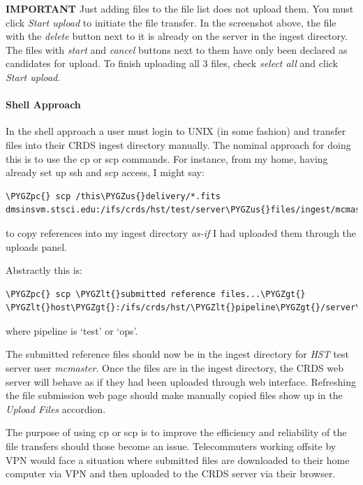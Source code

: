 \documentclass[letterpaper,10pt,english]{sphinxmanual}
\def\PYGZus{\char`\_}
\def\PYGZlt{\char`\<}
\def\PYGZgt{\char`\>}
\def\PYGZpc{\char`\%}
\begin{document}
\textbf{IMPORTANT}  Just adding files to the file list does not upload them.   You
must click \emph{Start upload} to initiate the file transfer.   In the screenshot above,
the file with the \emph{delete} button next to it is already on the server in the
ingest directory.   The files with \emph{start} and \emph{cancel} buttons next to them have
only been declared as candidates for upload.   To finish uploading all 3 files,
check \emph{select all} and click \emph{Start upload}.


\paragraph{Shell Approach}
\label{web_site_use:shell-approach}
In the shell approach a user must login to UNIX (in some fashion) and transfer
files into their CRDS ingest directory manually.   The nominal approach
for doing this is to use the cp or scp commands.   For instance,  from my home,
having already set up ssh and scp access, I might say:

\begin{Verbatim}[commandchars=\\\{\}]
\PYGZpc{} scp /this\PYGZus{}delivery/*.fits   dmsinsvm.stsci.edu:/ifs/crds/hst/test/server\PYGZus{}files/ingest/mcmaster
\end{Verbatim}

to copy references into my ingest directory \emph{as-if} I had uploaded them through
the uploads panel.

Abstractly this is:

\begin{Verbatim}[commandchars=\\\{\}]
\PYGZpc{} scp \PYGZlt{}submitted reference files...\PYGZgt{}   \PYGZlt{}host\PYGZgt{}:/ifs/crds/hst/\PYGZlt{}pipeline\PYGZgt{}/server\PYGZus{}files/ingest\PYGZlt{}crds\PYGZus{}username\PYGZgt{}
\end{Verbatim}

where pipeline is `test' or `ops'.

The submitted reference files should now be in the ingest directory for \emph{HST} test server
user \emph{mcmaster}.   Once the files are in the ingest directory,  the CRDS web server
will behave as if they had been uploaded through web interface.  Refreshing the
file submission web page should make manually copied files show up in the
\emph{Upload Files} accordion.

The purpose of using cp or scp is to improve the efficiency and reliability of
the file transfers should those become an issue.  Telecommuters working offsite by VPN
would face a situation where submitted files are downloaded to their home computer via
VPN and then uploaded to the CRDS server via their browser.
\end{document}
